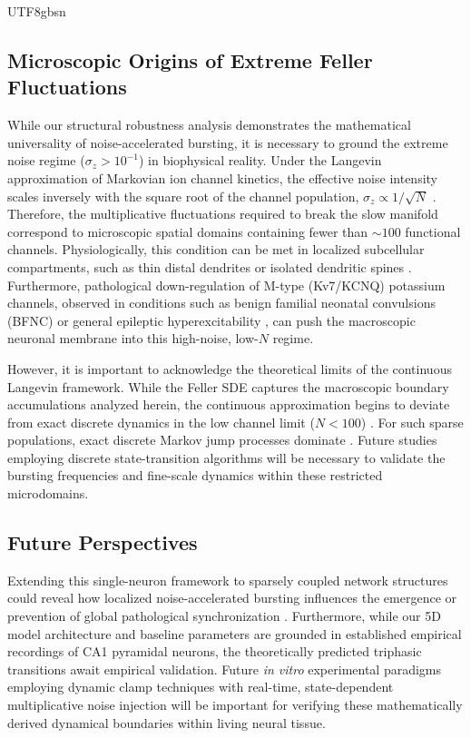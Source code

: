 ﻿\documentclass[reprint, amsmath, amssymb, aps, pre]{revtex4-2}
\begin{document}
\begin{CJK*}{UTF8}{gbsn}
\subsection{Microscopic Origins of Extreme Feller Fluctuations}
While our structural robustness analysis demonstrates the mathematical universality of noise-accelerated bursting, it is necessary to ground the extreme noise regime ($\sigma_z > 10^{-1}$) in biophysical reality. Under the Langevin approximation of Markovian ion channel kinetics, the effective noise intensity scales inversely with the square root of the channel population, $\sigma_z \propto 1/\sqrt{N}$ \cite{faisal2008noise}. Therefore, the multiplicative fluctuations required to break the slow manifold correspond to microscopic spatial domains containing fewer than $\sim 100$ functional channels. Physiologically, this condition can be met in localized subcellular compartments, such as thin distal dendrites or isolated dendritic spines \cite{goldwyn2011what}. Furthermore, pathological down-regulation of M-type (Kv7/KCNQ) potassium channels, observed in conditions such as benign familial neonatal convulsions (BFNC) or general epileptic hyperexcitability \cite{jentsch2000neuronal, brown2009neural}, can push the macroscopic neuronal membrane into this high-noise, low-$N$ regime. 

However, it is important to acknowledge the theoretical limits of the continuous Langevin framework. While the Feller SDE captures the macroscopic boundary accumulations analyzed herein, the continuous approximation begins to deviate from exact discrete dynamics in the low channel limit ($N < 100$) \cite{fox1994emergent}. For such sparse populations, exact discrete Markov jump processes dominate \cite{gillespie1977exact}. Future studies employing discrete state-transition algorithms will be necessary to validate the bursting frequencies and fine-scale dynamics within these restricted microdomains.

\subsection{Future Perspectives}
Extending this single-neuron framework to sparsely coupled network structures could reveal how localized noise-accelerated bursting influences the emergence or prevention of global pathological synchronization \cite{yamakou2020optimal, baspinar2021coherence}. Furthermore, while our 5D model architecture and baseline parameters are grounded in established empirical recordings of CA1 pyramidal neurons, the theoretically predicted triphasic transitions await empirical validation. Future \textit{in vitro} experimental paradigms employing dynamic clamp techniques with real-time, state-dependent multiplicative noise injection will be important for verifying these mathematically derived dynamical boundaries within living neural tissue.


\end{CJK*}
\end{document}
